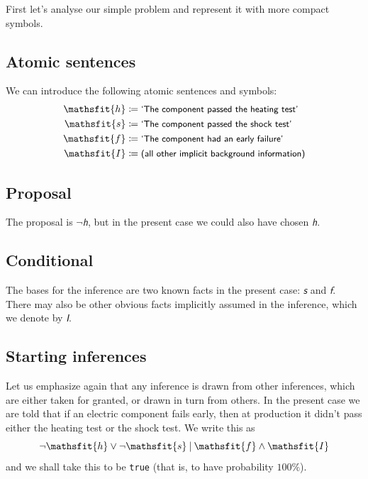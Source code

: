 \documentclass[
  a4paper,
  DIV=11,
  numbers=noendperiod,
  oneside]{scrreprt}
\begin{document}
First let's analyse our simple problem and represent it with more
compact symbols.

\hypertarget{atomic-sentences-1}{%
\subsection{Atomic sentences}\label{atomic-sentences-1}}

We can introduce the following atomic sentences and symbols: \[
\begin{aligned}
\mathsfit{h}&\coloneqq \textsf{\small`The component passed the heating test'}
\\
\mathsfit{s}&\coloneqq \textsf{\small`The component passed the shock test'}
\\
\mathsfit{f}&\coloneqq \textsf{\small`The component had an early failure'}
\\
\mathsfit{I}&\coloneqq \textsf{\small (all other implicit background information)}
\end{aligned}
\]

\hypertarget{proposal}{%
\subsection{Proposal}\label{proposal}}

The proposal is \(\lnot\mathsfit{h}\), but in the present case we could
also have chosen \(\mathsfit{h}\).

\hypertarget{conditional}{%
\subsection{Conditional}\label{conditional}}

The bases for the inference are two known facts in the present case:
\(\mathsfit{s}\) and \(\mathsfit{f}\). There may also be other obvious
facts implicitly assumed in the inference, which we denote by
\(\mathsfit{I}\).

\hypertarget{starting-inferences}{%
\subsection{Starting inferences}\label{starting-inferences}}

Let us emphasize again that any inference is drawn from other
inferences, which are either taken for granted, or drawn in turn from
others. In the present case we are told that if an electric component
fails early, then at production it didn't pass either the heating test
or the shock test. We write this as \[
\lnot\mathsfit{h}\lor \lnot\mathsfit{s}\nonscript\:\vert\nonscript\:\mathopen{} \mathsfit{f}\land \mathsfit{I}
\] and we shall take this to be \texttt{true} (that is, to have
probability {\(100\%\)}).
\end{document}
